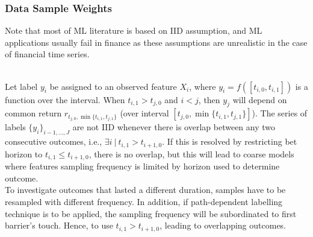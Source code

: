 \subsubsection{Data Sample Weights}

Note that most of ML literature is based on IID assumption, and ML applications usually fail in finance as these assumptions are unrealistic in the case of financial time series.

\begin{remark} \\
Let label $y_i$ be assigned to an observed feature $X_i$, where $y_i = f([t_{i,0}, t_{i,1}])$ is a function over the interval. When $t_{i,1} > t_{j,0}$ and $i < j$, then $y_j$ will depend on common return $r_{t_{j,0}, \min\{t_{i,1}, t_{j,1}\}}$ (over interval $[t_{j,0}, \min\{t_{i,1}, t_{j,1}\}]$). The series of labels $\{y_i \}_{i-1, \ldots, J}$ are not IID whenever there is overlap between any two consecutive outcomes, i.e., $\exists i \ \vert \ t_{i,1} > t_{i+1, 0}$. If this is resolved by restricting bet horizon to $t_{i,1} \leq t_{i+1, 0}$, there is no overlap, but this will lead to coarse models where features sampling frequency is limited by horizon used to determine outcome.\\
To investigate outcomes that lasted a different duration, samples have to be resampled with different frequency. In addition, if path-dependent labelling technique is to be applied, the sampling frequency will be subordinated to first barrier's touch. Hence, to use $t_{i,1} > t_{i+1, 0}$, leading to overlapping outcomes.
\end{remark}